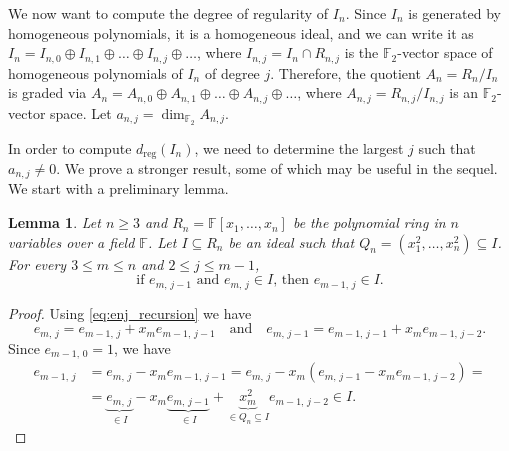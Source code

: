 \documentclass[11pt]{article}
\newcommand{\F}[0]{\mathbb{F}}
\newcommand{\es}[2]{e_{#1,\, #2}}
\theoremstyle{plain}
\newtheorem{lem}[theo]{Lemma}
\theoremstyle{definition}
\theoremstyle{remark}
\begin{document}
We now want to compute the degree of regularity of $I_n$. Since $I_n$ is generated by homogeneous polynomials, it is a homogeneous ideal, and we can write it as $I_n=I_{n,0}\oplus I_{n,1}\oplus\dots\oplus I_{n,j}\oplus\dots$, where $I_{n,j}=I_n\cap R_{n,j}$ is the $\mathbb{F}_2$-vector space of homogeneous polynomials of $I_n$ of degree $j$. Therefore, the quotient $A_n=R_n/I_n$ is graded via $A_n=A_{n,0}\oplus A_{n,1}\oplus\dots\oplus A_{n,j}\oplus\dots$, where $A_{n,j}=R_{n,j}/I_{n,j}$ is an $\mathbb{F}_2$-vector space. Let $a_{n,j}=\operatorname{dim}_{\F_2} A_{n,j}$.

In order to compute $d_{\operatorname{reg}}(I_n)$, we need to determine the largest $j$ such that $a_{n,j}\neq 0$. We prove a stronger result, some of which may be useful in the sequel. We start with a preliminary lemma.
\begin{lem}\label{lemEspcascata}
    Let $n\geq 3$ and $R_n=\F[x_1,\dots,x_n]$ be the polynomial ring in $n$ variables over a field $\F$. Let $I\subseteq R_n$ be an ideal such that $Q_n=(x_1^2,\dots,x_n^2)\subseteq I$. For every $3\leq m\leq n$ and $2\leq j\leq m-1$,
    \begin{equation*}
        \text{if }\es{m}{j-1}\text{ and }\es{m}{j}\in I\text{, then }\es{m-1}{j}\in I.
    \end{equation*}
\end{lem}
\begin{proof}
    Using \eqref{eq:enj_recursion} we have
    \begin{equation*}
        \es{m}{j}=\es{m-1}{j}+x_m\es{m-1}{j-1}\quad\text{and}\quad\es{m}{j-1}=\es{m-1}{j-1}+x_m\es{m-1}{j-2}.
    \end{equation*}  
    Since $\es{m-1}{0}=1$, we have
    \begin{align*}
        \es{m-1}{j}
        &=\es{m}{j}-x_m\es{m-1}{j-1}=\es{m}{j}-x_m(\es{m}{j-1}-x_m\es{m-1}{j-2})=\\
        &=\underbrace{\es{m}{j}}_{\in I}-x_m\underbrace{\es{m}{j-1}}_{\in I}+\underbrace{x_m^2}_{\in Q_n\subseteq I}\es{m-1}{j-2}\in I.
    \end{align*}    
\end{proof}
\end{document}

